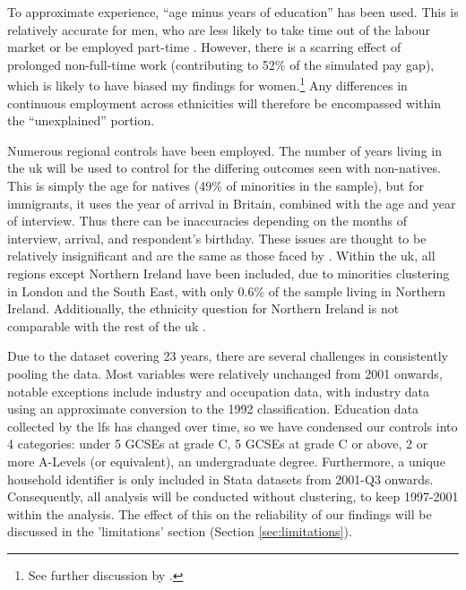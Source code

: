 \documentclass[class=article, crop=false]{standalone}
\begin{document}
To approximate experience, \enquote{age minus years of education} has been used. This is relatively accurate for men, who are less likely to take time out of the labour market or be employed part-time \citep{Olsen}. However, there is a scarring effect of prolonged non-full-time work (contributing to 52\% of the simulated pay gap), which is likely to have biased my findings for women.\footnote{See further discussion by \citet{Walby}.} Any differences in continuous employment across ethnicities will therefore be encompassed within the \enquote{unexplained} portion.

Numerous regional controls have been employed. The number of years living in the \acrshort{uk} will be used to control for the differing outcomes seen with non-natives. This is simply the age for natives (49\% of minorities in the sample), but for immigrants, it uses the year of arrival in Britain, combined with the age and year of interview. Thus there can be inaccuracies depending on the months of interview, arrival, and respondent’s birthday. These issues are thought to be relatively insignificant and are the same as those faced by \citet{Berthoud}. Within the \acrshort{uk}, all regions except Northern Ireland have been included, due to minorities clustering in London and the South East, with only 0.6\% of the sample living in Northern Ireland. Additionally, the ethnicity question for Northern Ireland is not comparable with the rest of the \acrshort{uk} \citep{Longhi}.

Due to the dataset covering 23 years, there are several challenges in consistently pooling the data. Most variables were relatively unchanged from 2001 onwards, notable exceptions include industry and occupation data, with industry data using an approximate conversion to the 1992 classification. Education data collected by the \acrshort{lfs} has changed over time, so we have condensed our controls into 4 categories: under 5 GCSEs at grade C, 5 GCSEs at grade C or above, 2 or more A-Levels (or equivalent), an undergraduate degree. Furthermore, a unique household identifier is only included in Stata datasets from 2001-Q3 onwards. Consequently, all analysis will be conducted without clustering, to keep 1997-2001 within the analysis. The effect of this on the reliability of our findings will be discussed in the 'limitations' section (Section \ref{sec:limitations}).

\end{document}
